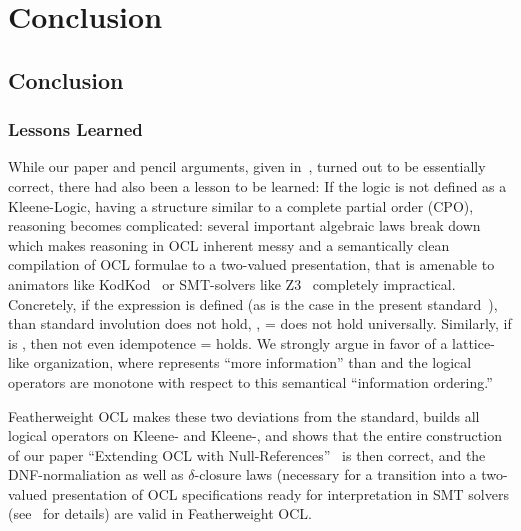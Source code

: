 \part{Conclusion}

\chapter{Conclusion}

\section{Lessons Learned}
While our paper and pencil arguments, given
in~\cite{brucker.ea:ocl-null:2009}, turned out to be essentially
correct, there had also been a lesson to be learned: If the logic is
not defined as a Kleene-Logic, having a structure similar to a
complete partial order (CPO), reasoning becomes complicated: several important algebraic laws break down
which makes reasoning in OCL inherent messy and a semantically clean
compilation of OCL formulae to a two-valued presentation, that is
amenable to animators like KodKod~\cite{torlak.ea:kodkod:2007} or
SMT-solvers like Z3~\cite{moura.ea:z3:2008} completely
impractical. Concretely, if the expression 
is defined  (as is the case in the
present standard~\cite{omg:ocl:2012}), than standard involution does
not hold, \ie,  =  does not hold
universally. Similarly, if
 is , then not even
idempotence  =  holds. We strongly argue in favor of a lattice-like
organization, where  represents ``more information''
than  and the logical operators are monotone with
respect to this semantical ``information ordering.''

Featherweight OCL makes these two deviations from the standard,
builds all logical operators on Kleene- and
Kleene-, and shows that the entire construction of our
paper ``Extending OCL with
Null-References''~\cite{brucker.ea:ocl-null:2009} is then correct, and
the DNF-normaliation as well as $\delta$-closure laws (necessary
for a transition into a two-valued presentation of OCL specifications
ready for interpretation in SMT solvers
(see~\cite{brucker.ea:ocl-testing:2010} for details) are valid in
Featherweight OCL.

